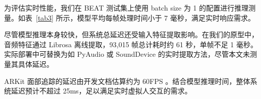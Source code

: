 为评估实时性能，我们在 BEAT 测试集上使用 batch size 为 1 的配置进行推理测量。如表~\ref{tab3} 所示，模型平均每帧处理时间小于 7 毫秒，满足实时响应需求。

尽管模型推理本身较快，但系统总延迟还受输入特征提取影响。在我们的原型中，音频特征通过 Librosa 离线提取，93,015 帧总计耗时约 61 秒，单帧不足 1 毫秒。实际部署中可替换为如 PyAudio 或 SoundDevice 的实时提取方法，尽管本文未测量其具体延迟。

ARKit 面部追踪的延迟由开发文档估算约为 60FPS \cite{AppleARKitTrackingGuide}。结合模型推理时间，整体系统延迟预计不超过 25ms，足以满足实时虚拟人交互的需求。
